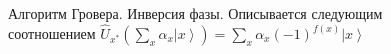 \begin{figure}
\centering



\caption{Алгоритм Гровера. Инверсия фазы. Описывается следующим
  соотношением  $\hat{U}_{x^{\ast}}\left(\sum_x \alpha_x
  \left|x\right>\right) =  
\sum_x \alpha_x \left(-1\right)^{f\left(x\right)}\left|x\right>$}
\label{figQuantCompGroverInv}
\end{figure}
